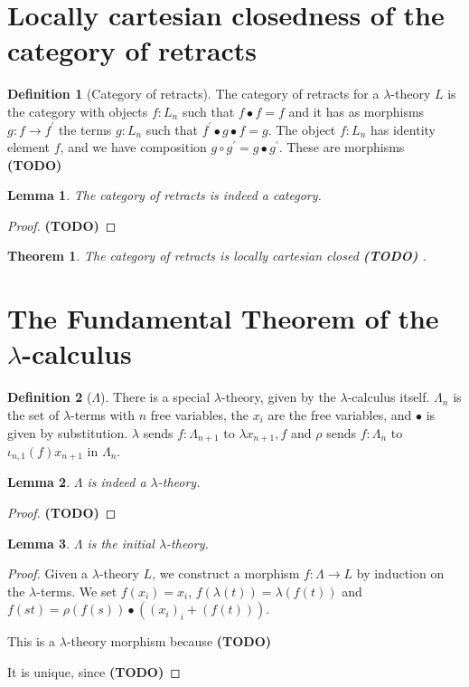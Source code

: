 \documentclass[a4paper]{amsbook}
\newtheorem{lemma}{Lemma}
\newtheorem{theorem}{Theorem}
\theoremstyle{definition}
\newtheorem{definition}{Definition}
\theoremstyle{remark}
\newcommand\TODO{\textbf{(TODO)} }
\begin{document}
  \section{Locally cartesian closedness of the category of retracts}
  \begin{definition}[Category of retracts]
    The category of retracts for a $ \lambda $-theory $ L $ is the category with objects $ f: L_n $ such that $ f \bullet f = f $ and it has as morphisms $ g: f \to f^\prime $ the terms $ g: L_n $ such that $ f^\prime \bullet g \bullet f = g $. The object $ f: L_n $ has identity element $ f $, and we have composition $ g \circ g^\prime = g \bullet g^\prime $. These are morphisms \TODO
  \end{definition}

  \begin{lemma}
    The category of retracts is indeed a category.
  \end{lemma}
  \begin{proof}
    \TODO
  \end{proof}

  \begin{theorem}
    The category of retracts is locally cartesian closed \TODO.
  \end{theorem}

  \section{The Fundamental Theorem of the \texorpdfstring{$ \lambda $-}{lambda }calculus}

  \begin{definition}[$ \Lambda $]
    There is a special $ \lambda $-theory, given by the $ \lambda $-calculus itself. $ \Lambda_n $ is the set of $ \lambda $-terms with $ n $ free variables, the $ x_i $ are the free variables, and $ \bullet $ is given by substitution. $ \lambda $ sends $ f: \Lambda_{n + 1} $ to $ \lambda x_{n + 1}, f $ and $ \rho $ sends $ f: \Lambda_n $ to $ \iota_{n, 1}(f) x_{n + 1} $ in $ \Lambda_n $.
  \end{definition}

  \begin{lemma}
    $ \Lambda $ is indeed a $ \lambda $-theory.
  \end{lemma}
  \begin{proof}
    \TODO
  \end{proof}

  \begin{lemma}
    $ \Lambda $ is the initial $ \lambda $-theory.
  \end{lemma}
  \begin{proof}
    Given a $ \lambda $-theory $ L $, we construct a morphism $ f: \Lambda \to L $ by induction on the $ \lambda $-terms. We set $ f(x_i) = x_i $, $ f(\lambda(t)) = \lambda(f(t)) $ and $ f(st) = \rho(f(s)) \bullet ((x_i)_i + (f(t))) $.

    This is a $ \lambda $-theory morphism because \TODO

    It is unique, since \TODO
  \end{proof}
\end{document}

